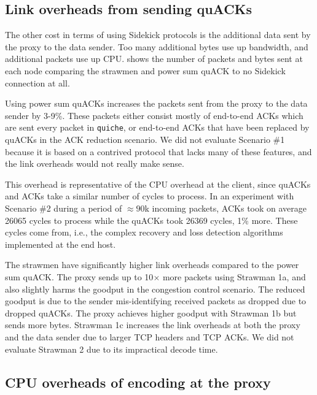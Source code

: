 \subsection{Link overheads from sending quACKs}
\label{sec:sidekick:emulation:link-overheads}



The other cost in terms of using Sidekick protocols is the additional data sent
by the proxy to the data sender. Too many additional bytes use up bandwidth,
and additional packets use up CPU\@.  shows
the number of packets and bytes sent at each node comparing the strawmen and
power sum quACK to no Sidekick connection at all.

Using power sum quACKs increases the packets sent from the proxy to the data
sender
by 3-9\%. These packets either consist mostly
of end-to-end ACKs which are sent every packet in \texttt{quiche}, or end-to-end
ACKs that have been replaced by quACKs in the ACK reduction scenario.
We did not evaluate Scenario \#1 because it is based
on a contrived protocol that lacks many of these features, and the link
overheads would not really make sense.

This overhead is representative of the CPU overhead at the client, since
quACKs and ACKs take a similar number of cycles to process. In an experiment
with Scenario \#2 during a period of $\approx90$k incoming packets, ACKs took on
average 26065 cycles to process while the quACKs took 26369 cycles, 1\% more.
These cycles come from, i.e., the complex recovery and loss detection algorithms
implemented at the end host.

The strawmen have significantly higher link overheads compared to the power sum
quACK\@. The proxy sends up to 10$\times$ more packets using Strawman 1a, and
also slightly harms the goodput in the congestion control scenario.
The reduced goodput is due to the sender mis-identifying received packets as
dropped due to dropped quACKs.
The proxy achieves higher goodput with Strawman 1b but sends
more bytes. Strawman 1c increases the link overheads at both the proxy and the
data sender due to larger TCP headers and TCP ACKs.
We did not evaluate Strawman 2 due to its impractical decode time.

\subsection{CPU overheads of encoding at the proxy}
\label{sec:sidekick:emulation:cpu-overheads}

